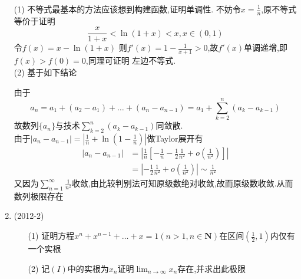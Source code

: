 \documentclass[12pt, a4paper, oneside, UTF8]{ctexbook}
\begin{document}
\begin{enumerate}
{        \begin{solution}[收敛级数]
            (1) 不等式最基本的方法应该想到构建函数,证明单调性. 不妨令$x=\frac{1}{n}$,原不等式等价于证明
            $$
            \frac{x}{1+x} < \ln{(1+x)} < x, x\in(0,1)
            $$
            令$f(x) = x - \ln(1+x)$ 则$f'(x)=1-\frac{1}{x+1} > 0$,故$f'(x)$单调递增,即$f(x)>f(0) = 0$,同理可证明
            左边不等式. \\
            (2) 基于如下结论
            \begin{center}
            \end{center}
            由于
            $$
            a_n = a_1 + (a_2 - a_1) + \ldots + (a_n - a_{n-1}) = a_1 + \sum_{k=2}^{n}(a_k-a_{k-1})
            $$
            故数列$\{a_n\}$与技术$\sum_{k=2}^{n}(a_k-a_{k-1})$同敛散. \\
            由于$\left|a_n-a_{n-1}\right| = \left|\frac{1}{n}+\ln\left(1-\frac{1}{n}\right)\right|$做Taylor展开有 
            \begin{align*}
                \left|a_n-a_{n-1}\right| &= \left|\frac{1}{n}\left[-\frac{1}{n}-\frac{1}{2}\frac{1}{n^2}+o(\frac{1}{n^2})\right]\right| \\
                &=\left|-\frac{1}{2}\frac{1}{n^2}+o(\frac{1}{n^2})\right| \sim \frac{1}{n^2}
            \end{align*}
            又因为$\sum_{n=1}^{\infty}\frac{1}{n^2}$收敛,由比较判别法可知原级数绝对收敛,故而原级数收敛.从而数列极限存在
        \end{solution}
    }
    \item (2012-2) \bt 
    \begin{enumerate}
        \item [(1)] 证明方程$x^{n}+x^{n-1}+\ldots+x=1(n>1,n\in\mathbf{N})$在区间$\left(\frac{1}{2},1\right)$内仅有一个实根 
        \item [(2)] 记$(I)$中的实根为$x_n$证明$ \lim_{n\to\infty}x_n$存在,并求出此极限 
    \end{enumerate}


\end{enumerate}
\end{document}
